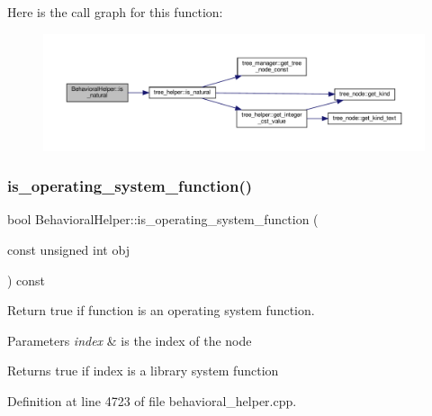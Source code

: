 Here is the call graph for this function\+:
\nopagebreak
\begin{figure}[H]
\begin{center}
\leavevmode
\includegraphics[width=350pt]{dd/db2/classBehavioralHelper_afd32eb4b60122768233ad5dca8a822ab_cgraph}
\end{center}
\end{figure}
\mbox{\label{classBehavioralHelper_a07a49444e63eee25cda5f42f273d1b25}} 
\subsubsection{\texorpdfstring{is\+\_\+operating\+\_\+system\+\_\+function()}{is\_operating\_system\_function()}}
{\footnotesize\ttfamily bool Behavioral\+Helper\+::is\+\_\+operating\+\_\+system\+\_\+function (\begin{DoxyParamCaption}\item[{const unsigned int}]{obj }\end{DoxyParamCaption}) const\hspace{0.3cm}{\ttfamily [virtual]}}



Return true if function is an operating system function. 


\begin{DoxyParams}{Parameters}
{\em index} & is the index of the node \\
\hline
\end{DoxyParams}
\begin{DoxyReturn}{Returns}
true if index is a library system function 
\end{DoxyReturn}


Definition at line 4723 of file behavioral\+\_\+helper.\+cpp.



